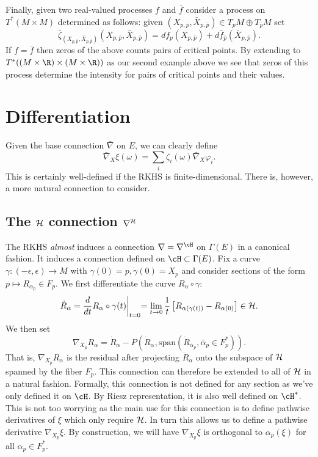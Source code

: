 \documentclass{article}
\begin{document}
Finally, given two real-valued processes $f$ and $\bar{f}$ consider a process on $T^*(M \times M)$ determined as follows: given $(X_{p,\bar{p}}, \bar{X}_{p,\bar{p}}) \in T_pM \oplus T_{\bar{p}}M$
set
$$
\bar{\zeta}_{(X_{p,\bar{p}}, \bar{X}_{p,\bar{p}})}(X_{p,\bar{p}}, \bar{X}_{p,\bar{p}}) = df_p(X_{p,\bar{p}}) + d\bar{f}_{\bar{p}}(\bar{X}_{p,\bar{p}}).
$$ If $f=\bar{f}$ then zeros of the above counts pairs of critical
points. By extending to $T^*((M \times \R) \times (M \times \R))$ as
our second example above we see that zeros of this process determine
the intensity for pairs of critical points and their values.

\section{Differentiation}

Given the base connection $\bar{\nabla}$ on $E$, we can clearly define
$$
\bar{\nabla}_X\xi(\omega) = \sum_i \zeta_i(\omega) \bar{\nabla}_X \varphi_i.
$$
This is certainly well-defined if the RKHS is finite-dimensional. There is, however, a more natural
connection to consider.

\subsection{The ${\cal H}$ connection $\nabla^{\cal H}$}

The RKHS {\em almost} induces a connection $\nabla=\nabla^{\cH}$ on $\Gamma(E)$  in a canonical fashion.
It induces a connection defined on $\cH \subset \Gamma(E)$.
Fix a curve $\gamma:(-\epsilon,\epsilon) \to M$ with $\gamma(0)=p, \dot{\gamma}(0)=X_p$
and consider sections of the form
$p \mapsto R_{\alpha_p} \in F_p$. We first differentiate the curve $R_{\alpha} \circ \gamma$:
\begin{equation}
\dot{R}_{\alpha} = \frac{d}{dt} R_{\alpha} \circ \gamma(t) \biggl|_{t=0} = \lim_{t \to 0} \frac{1}{t} \left[ R_{\alpha(\gamma(t))} - R_{\alpha(0)}\right] \in {\cal H}.
\end{equation}
We then set
$$
\nabla_{X_p}R_{\alpha} = \dot{R}_{\alpha} - P(\dot{R}_{\alpha}, \text{span}(\dot{R}_{\bar{\alpha}_p}, \bar{\alpha}_p \in F_p^*)).
$$
That is, $\nabla_{X_p}R_{\alpha}$ is the residual after projecting $\dot{R}_{\alpha}$ onto the subspace of ${\cal H}$ spanned by the fiber $F_p$.
This connection can therefore be extended to all of ${\cal H}$ in a natural fashion.
Formally, this connection is not defined for any section as we've only defined it on $\cH$. By Riesz
representation,
it is also well defined on $\cH^*$. This is not too worrying as the main use for this connection is to define pathwise derivatives of $\xi$ which only require
${\cal H}$. In turn this allows us to define
a pathwise derivative $\nabla_{X_p}\xi$. By construction, we will have $\nabla_{X_p}\xi$ is orthogonal
to $\alpha_p(\xi)$ for all $\alpha_p \in F_p^*$.
\end{document}

